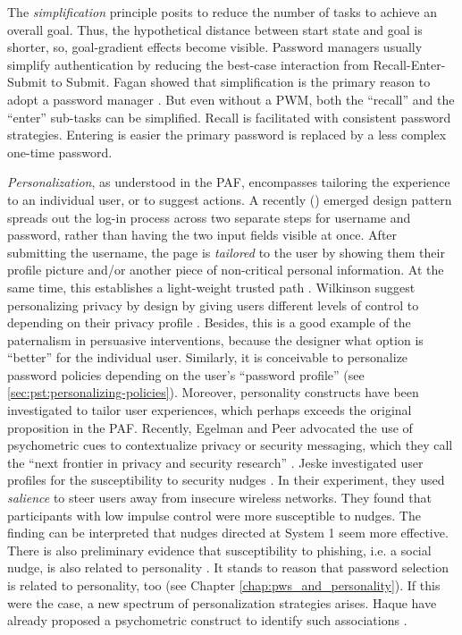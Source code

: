 	The \textit{simplification} principle posits to reduce the number of tasks to achieve an overall goal. Thus, the hypothetical distance between start state and goal is shorter, so, goal-gradient effects become visible. Password managers usually simplify authentication by reducing the best-case interaction from Recall-Enter-Submit to Submit. Fagan \etal showed that simplification is the primary reason to adopt a password manager \cite{Fagan2017UsersConsiderationsPWMs}. But even without a \gls{PWM}, both the ``recall'' and the ``enter'' sub-tasks can be simplified. Recall is facilitated with consistent password strategies. Entering is easier the primary password is replaced by a less complex one-time password. 
	
	\textit{Personalization}, as understood in the \gls{PAF}, encompasses tailoring the experience to an individual user, or to suggest actions. 
	A recently (\ar) emerged design pattern spreads out the log-in process across two separate steps for username and password, rather than having the two input fields visible at once. After submitting the username, the page is \textit{tailored} to the user by showing them their profile picture and/or another piece of non-critical personal information. At the same time, this establishes a light-weight trusted path \cite{Ye2005TrustedPaths}. Wilkinson \etal suggest personalizing privacy by design by giving users different levels of control to depending on their privacy profile \cite{Wilkinson2017UserTailoredPBD}. Besides, this is a good example of the paternalism in persuasive interventions, because the designer what option is ``better'' for the individual user. Similarly, it is conceivable to personalize password policies depending on the user's ``password profile'' (see \ref{sec:pst:personalizing-policies}). Moreover, personality constructs have been investigated to tailor user experiences, which perhaps exceeds the original proposition in the \gls{PAF}. Recently, Egelman and Peer advocated the use of psychometric cues to contextualize privacy or security messaging, which they call the ``next frontier in privacy and security research'' \cite{Egelman2015AverageUser}. Jeske \etal investigated user profiles for the susceptibility to security nudges \cite{Jeske2014NudgingWhomHow}. In their experiment, they used \textit{salience} to steer users away from insecure wireless networks. They found that participants with low impulse control were more susceptible to nudges. The finding can be interpreted that nudges directed at System 1 seem more effective. There is also preliminary evidence that susceptibility to phishing, i.e. a social nudge, is also related to personality \cite{Halevi2013PilotStudyPersonality}. It stands to reason that password selection is related to personality, too (see Chapter \ref{chap:pws_and_personality}). If this were the case, a new spectrum of personalization strategies arises. Haque \etal have already proposed a psychometric construct to identify such associations \cite{Haque2014PsychometricsStrongPassword}.
